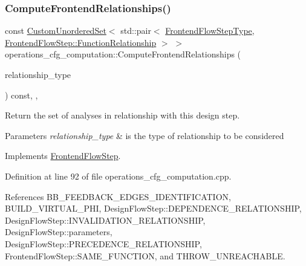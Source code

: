 \subsubsection{\texorpdfstring{Compute\+Frontend\+Relationships()}{ComputeFrontendRelationships()}}
{\footnotesize\ttfamily const \hyperlink{classCustomUnorderedSet}{Custom\+Unordered\+Set}$<$ std\+::pair$<$ \hyperlink{frontend__flow__step_8hpp_afeb3716c693d2b2e4ed3e6d04c3b63bb}{Frontend\+Flow\+Step\+Type}, \hyperlink{classFrontendFlowStep_af7cf30f2023e5b99e637dc2058289ab0}{Frontend\+Flow\+Step\+::\+Function\+Relationship} $>$ $>$ operations\+\_\+cfg\+\_\+computation\+::\+Compute\+Frontend\+Relationships (\begin{DoxyParamCaption}\item[{const \hyperlink{classDesignFlowStep_a723a3baf19ff2ceb77bc13e099d0b1b7}{Design\+Flow\+Step\+::\+Relationship\+Type}}]{relationship\+\_\+type }\end{DoxyParamCaption}) const\hspace{0.3cm}{\ttfamily [override]}, {\ttfamily [private]}, {\ttfamily [virtual]}}



Return the set of analyses in relationship with this design step. 


\begin{DoxyParams}{Parameters}
{\em relationship\+\_\+type} & is the type of relationship to be considered \\
\hline
\end{DoxyParams}


Implements \hyperlink{classFrontendFlowStep_abeaff70b59734e462d347ed343dd700d}{Frontend\+Flow\+Step}.



Definition at line 92 of file operations\+\_\+cfg\+\_\+computation.\+cpp.



References B\+B\+\_\+\+F\+E\+E\+D\+B\+A\+C\+K\+\_\+\+E\+D\+G\+E\+S\+\_\+\+I\+D\+E\+N\+T\+I\+F\+I\+C\+A\+T\+I\+ON, B\+U\+I\+L\+D\+\_\+\+V\+I\+R\+T\+U\+A\+L\+\_\+\+P\+HI, Design\+Flow\+Step\+::\+D\+E\+P\+E\+N\+D\+E\+N\+C\+E\+\_\+\+R\+E\+L\+A\+T\+I\+O\+N\+S\+H\+IP, Design\+Flow\+Step\+::\+I\+N\+V\+A\+L\+I\+D\+A\+T\+I\+O\+N\+\_\+\+R\+E\+L\+A\+T\+I\+O\+N\+S\+H\+IP, Design\+Flow\+Step\+::parameters, Design\+Flow\+Step\+::\+P\+R\+E\+C\+E\+D\+E\+N\+C\+E\+\_\+\+R\+E\+L\+A\+T\+I\+O\+N\+S\+H\+IP, Frontend\+Flow\+Step\+::\+S\+A\+M\+E\+\_\+\+F\+U\+N\+C\+T\+I\+ON, and T\+H\+R\+O\+W\+\_\+\+U\+N\+R\+E\+A\+C\+H\+A\+B\+LE.

